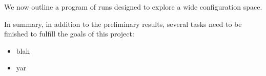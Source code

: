 We now outline a program of runs designed to explore a wide configuration space.


In summary, in addition to the preliminary results, several tasks need to
be finished to fulfill the goals of this project:

\begin{itemize}
\item blah
\item yar
\end{itemize}
